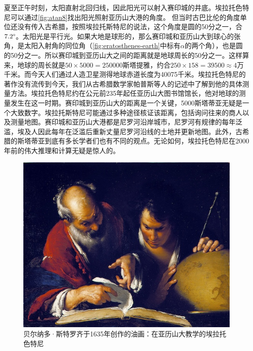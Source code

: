 \documentclass[b5paper]{ctexart}
\begin{document}
夏至正午时刻，太阳直射北回归线，因此阳光可以射入赛印城的井底。埃拉托色特尼可以通过\cref{fig:atan8}找出阳光照射亚历山大港的角度。
但当时古巴比伦的角度单位还没有传入古希腊，按照埃拉托斯特尼的说法，这个角度是圆的50分之一，合$7.2\degree$。太阳光是平行光。如果大地是球形的，那么赛印城和亚历山大到球心的张角，是太阳入射角的同位角（\cref{fig:eratosthenes-earth}中标有$\alpha$的两个角），也是圆的50分之一。所以赛印城到亚历山大之间的距离就是地球周长的50分之一。这样算来，地球的周长就是$50 \times 5000 = 250000$斯塔提雅，约合$250 \times 158 = 39500 \approx 4$万千米。而今天人们通过人造卫星测得地球赤道长度为40075千米。埃拉托色特尼的著作没有流传到今天，我们从古希腊数学家帕普斯等人的记述中了解到他的具体测量方法。埃拉托色特尼约在公元前235年起任亚历山大图书馆馆长，他对地球的测量发生在这一时期\cite{Walkup2005}。赛印城到亚历山大的距离是一个关键，5000斯塔蒂亚无疑是一个大致数字。埃拉托斯特尼可能通过多种途径核证该距离，包括询问往来的商人以及测量地图。赛印城和亚历山大港都是尼罗河沿岸城市，尼罗河有规律的每年泛滥，埃及人因此每年在泛滥后重新丈量尼罗河沿线的土地并更新地图。此外，古希腊的斯塔蒂亚到底有多长学者们也有不同的观点。无论如何，埃拉托色特尼在2000年前的伟大推理和计算无疑是惊人的。

\begin{figure}[htbp]
 \centering
 \includegraphics[scale=0.35]{img/eratosthenes}
 \caption{贝尔纳多·斯特罗齐于1635年创作的油画：在亚历山大教学的埃拉托色特尼}
 \label{fig:eratosthenes}
\end{figure}
\end{document}
